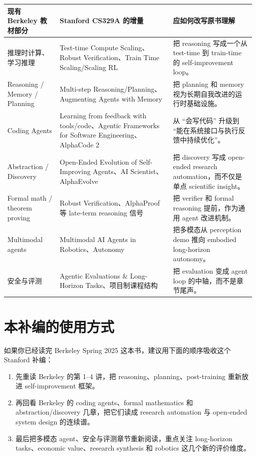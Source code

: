 \documentclass[UTF8]{ctexbook}
\begin{document}
\begin{longtable}{p{}p{}p{}}
\toprule
现有 Berkeley 教材部分 & Stanford CS329A 的增量 & 应如何改写原书理解 \\
\midrule
\endhead
推理时计算、学习推理 & Test-time Compute Scaling、Robust Verification、Train Time Scaling/Scaling RL & 把 reasoning 写成一个从 test-time 到 train-time 的 self-improvement loop。 \\
Reasoning / Memory / Planning & Multi-step Reasoning/Planning、Augmenting Agents with Memory & 把 planning 和 memory 视为长期自我改进的运行时基础设施。 \\
Coding Agents & Learning from feedback with tools/code、Agentic Frameworks for Software Engineering、AlphaCode 2 & 从 ``会写代码'' 升级到 ``能在系统接口与执行反馈中持续优化''。 \\
Abstraction / Discovery & Open-Ended Evolution of Self-Improving Agents、AI Scientist、AlphaEvolve & 把 discovery 写成 open-ended research automation，而不仅是单点 scientific insight。 \\
Formal math / theorem proving & Robust Verification、AlphaProof 等 late-term reasoning 信号 & 把 verifier 和 formal reasoning 提前，作为通用 agent 改进机制。 \\
Multimodal agents & Multimodal AI Agents in Robotics、Autonomy & 把多模态从 perception demo 推向 embodied long-horizon autonomy。 \\
安全与评测 & Agentic Evaluations \& Long-Horizon Tasks、项目制课程结构 & 把 evaluation 变成 agent loop 的中轴，而不是章节尾声。 \\
\bottomrule
\end{longtable}

\section{本补编的使用方式}

如果你已经读完 Berkeley Spring 2025 这本书，建议用下面的顺序吸收这个 Stanford 补编：
\begin{enumerate}
\item 先重读 Berkeley 的第 1--4 讲，把 reasoning、planning、post-training 重新放进 self-improvement 框架。
\item 再回看 Berkeley 的 coding agents、formal mathematics 和 abstraction/discovery 几章，把它们读成 research automation 与 open-ended system design 的连续谱。
\item 最后把多模态 agent、安全与评测章节重新阅读，重点关注 long-horizon tasks、economic value、research synthesis 和 robotics 这几个新的评价维度。
\end{enumerate}
\end{document}
